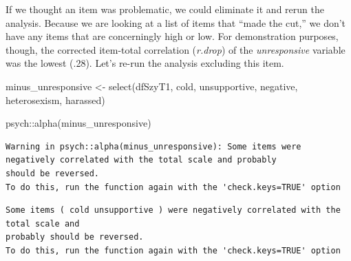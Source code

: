 \documentclass[
  english,
]{book}
\newenvironment{Shaded}{\begin{snugshade}}{\end{snugshade}}
\newcommand{\FunctionTok}[1]{\textcolor[rgb]{0.00,0.00,0.00}{#1}}
\newcommand{\NormalTok}[1]{#1}
\newcommand{\OtherTok}[1]{\textcolor[rgb]{0.56,0.35,0.01}{#1}}
\newcommand{\SpecialCharTok}[1]{\textcolor[rgb]{0.00,0.00,0.00}{#1}}
\begin{document}
If we thought an item was problematic, we could eliminate it and rerun the analysis. Because we are looking at a list of items that ``made the cut,'' we don't have any items that are concerningly high or low. For demonstration purposes, though, the corrected item-total correlation (\emph{r.drop}) of the \emph{unresponsive} variable was the lowest (.28). Let's re-run the analysis excluding this item.

\begin{Shaded}
\begin{Highlighting}[]
\NormalTok{minus\_unresponsive }\OtherTok{\textless{}{-}} \FunctionTok{select}\NormalTok{(dfSzyT1, cold,  unsupportive, negative, heterosexism, harassed)}
\end{Highlighting}
\end{Shaded}

\begin{Shaded}
\begin{Highlighting}[]
\NormalTok{psych}\SpecialCharTok{::}\FunctionTok{alpha}\NormalTok{(minus\_unresponsive) }
\end{Highlighting}
\end{Shaded}

\begin{verbatim}
Warning in psych::alpha(minus_unresponsive): Some items were negatively correlated with the total scale and probably 
should be reversed.  
To do this, run the function again with the 'check.keys=TRUE' option
\end{verbatim}

\begin{verbatim}
Some items ( cold unsupportive ) were negatively correlated with the total scale and 
probably should be reversed.  
To do this, run the function again with the 'check.keys=TRUE' option
\end{verbatim}
\end{document}
